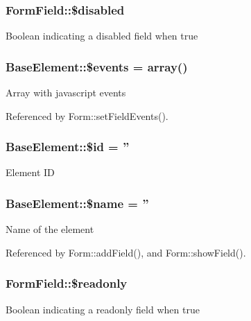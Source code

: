 \subsubsection[{\$disabled}]{\setlength{\rightskip}{0pt plus 5cm}FormField::\$disabled}\label{classFormField_ab6f1907061890290e32cb2befc0a5f50}
Boolean indicating a disabled field when true 
\subsubsection[{\$events}]{\setlength{\rightskip}{0pt plus 5cm}BaseElement::\$events = array()}\label{classBaseElement_a02cebe45d277b4ff8f29db08bad371ba}
Array with javascript events 

Referenced by Form::setFieldEvents().

\subsubsection[{\$id}]{\setlength{\rightskip}{0pt plus 5cm}BaseElement::\$id = ''}\label{classBaseElement_a11b6989c43b53869a09f5ce65aa55b45}
Element ID 
\subsubsection[{\$name}]{\setlength{\rightskip}{0pt plus 5cm}BaseElement::\$name = ''}\label{classBaseElement_a30b8cff187a9de659a70daf287d66f45}
Name of the element 

Referenced by Form::addField(), and Form::showField().

\subsubsection[{\$readonly}]{\setlength{\rightskip}{0pt plus 5cm}FormField::\$readonly}\label{classFormField_a78ba5d4b9127e75e8ccf86f397b5d9ac}
Boolean indicating a readonly field when true 
